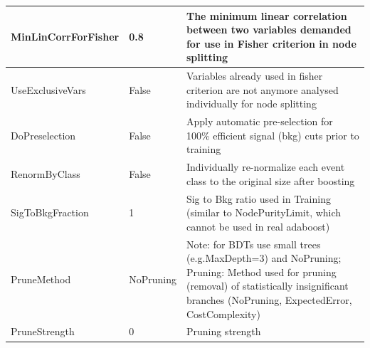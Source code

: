 \documentclass[11pt]{scrartcl}
\begin{document}
\begin{longtable}[c]{|p{4cm}|p{2.5cm}|p{7cm}|}
MinLinCorrForFisher  & 0.8                    & The minimum linear correlation between two variables demanded for use in Fisher criterion in node splitting                                                                                                                                                                                             \\ \hline
UseExclusiveVars     & False                  & Variables already used in fisher criterion are not anymore analysed individually for node splitting                                                                                                                                                                                                     \\ \hline
DoPreselection       & False                  & Apply automatic pre-selection for 100\% efficient signal (bkg) cuts prior to training                                                                                                                                                                                                                   \\ \hline
RenormByClass        & False                  & Individually re-normalize each event class to the original size after boosting                                                                                                                                                                                                                          \\ \hline
SigToBkgFraction     & 1                      & Sig to Bkg ratio used in Training (similar to NodePurityLimit, which cannot be used in real adaboost)                                                                                                                                                                                                   \\ \hline
PruneMethod          & NoPruning              & Note: for BDTs use small trees (e.g.MaxDepth=3) and NoPruning; Pruning: Method used for pruning (removal) of statistically insignificant branches (NoPruning, ExpectedError, CostComplexity)                                                                                                            \\ \hline
PruneStrength        & 0                      & Pruning strength                                                                                                                                                                                                                                                                                        \\ \hline

\end{longtable}
\end{document}
